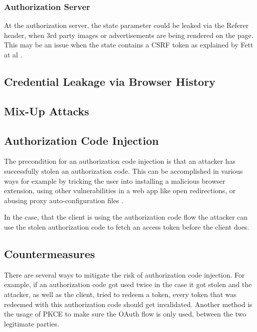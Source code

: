 \documentclass[
    fontsize=12pt,
    headings=small,
    parskip=half,           %
    bibliography=totoc,
    numbers=noenddot,       %
    open=any,               %
    ]{scrreprt}
\begin{document}
\subsubsection{Authorization Server}
At the authorization server, the state parameter could be leaked via the Referer header, when 3rd party images or advertisements are being rendered on the page. This may be an issue when the state contains a CSRF token as explained by Fett at al \cite{fett2016comprehensive}.


\subsection{Credential Leakage via Browser History}

\subsection{Mix-Up Attacks}

\subsection{Authorization Code Injection \cite{philippaerts2022oauch}} 
The precondition for an authorization code injection is that an attacker has successfully stolen an authorization code. This can be accomplished in various ways for example by tricking the user into installing a malicious browser extension, using other vulnerabilities in a web app like open redirections, or abusing proxy auto-configuration files \cite*{philippaerts2022oauch}.

In the case, that the client is using the authorization code flow the attacker can use the stolen authorization code to fetch an access token before the client does.

\subsection{Countermeasures}
There are several ways to mitigate the risk of authorization code injection. For example, if an authorization code got used twice in the case it got stolen and the attacker, as well as the client, tried to redeem a token, every token that was redeemed with this authorization code should get invalidated. Another method is the usage of PKCE to make sure the OAuth flow is only used, between the two legitimate parties.
\end{document}

